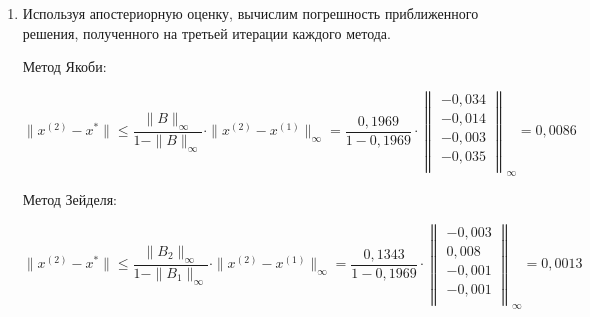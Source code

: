 \documentclass[a4paper,12pt]{article} %
\begin{document}
\begin{enumerate}
\newpage

\item Используя апостериорную оценку, вычислим погрешность приближенного решения, полученного на третьей итерации каждого метода.

Метод Якоби:

\begin{equation*}
    \|x^{(2)} - x^*\| \leq \frac{\|B\|_\infty}{1 - \|B\|_\infty} \cdot \|x^{(2)} - x^{(1)}\|_\infty = \frac{0,1969}{1 - 0,1969} \cdot 
    \begin{Vmatrix}
        -0,034 \\
        -0,014 \\
        -0,003 \\
        -0,035 \\
    \end{Vmatrix}_\infty
    = 0,0086
\end{equation*}

Метод Зейделя:

\begin{equation*}
    \|x^{(2)} - x^*\| \leq \frac{\|B_2\|_\infty}{1 - \|B_1\|_\infty} \cdot \|x^{(2)} - x^{(1)}\|_\infty = \frac{0,1343}{1 - 0,1969} \cdot 
    \begin{Vmatrix}
        -0,003 \\
        0,008 \\
        -0,001 \\
        -0,001 \\
    \end{Vmatrix}_\infty
    = 0,0013
\end{equation*}

\end{enumerate}
\end{document}
